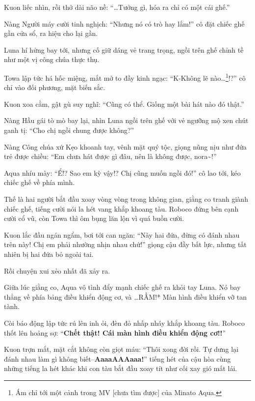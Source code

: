 \documentclass[../main.tex]{subfiles}
\begin{document}

Kuon liếc nhìn, rồi thở dài não nề: ``\dots Tưởng gì, hóa ra chỉ có một cái ghế.''

Nàng Người máy cười tinh nghịch: ``Nhưng nó có trò hay lắm!'' cô đặt chiếc ghế gần cửa sổ, ra hiệu cho lại gần.

Luna hí hửng bay tới, nhưng cố giữ dáng vẻ trang trọng, ngồi trên ghế chỉnh tề như một vị công chúa thực thụ.

Towa lập tức há hốc miệng, mắt mở to đầy kinh ngạc: ``K-Không lẽ nào\dots\footnote{Ám chỉ tới một cảnh trong MV [chưa tìm được] của Minato Aqua.}!?'' cô chỉ vào đối phương, mặt biến sắc.

Kuon xoa cằm, gật gù suy nghĩ: ``Cũng có thể. Giống một bài hát nào đó thật.''

Nàng Hầu gái tò mò bay lại, nhìn Luna ngồi trên ghế với vẻ ngưỡng mộ xen chút ganh tị: ``Cho chị ngồi chung được không?''

Nàng Công chúa xứ Kẹo khoanh tay, vênh mặt quý tộc, giọng nũng nịu như đứa trẻ được chiều: ``Em chưa hát được gì đâu, nên là không được, nora\~{}!''

Aqua nhíu mày: ``Ể!? Sao em kỳ vậy!? Chị cũng muốn ngồi đó!'' cô lao tới, kéo chiếc ghế về phía mình.

Thế là hai người bắt đầu xoay vòng vòng trong không gian, giằng co tranh giành chiếc ghế, tiếng cười nói la hét vang khắp khoang tàu. Roboco đứng bên cạnh cười cổ vũ, còn Towa thì ôm bụng lăn lộn vì quá buồn cười.


Kuon lắc đầu ngán ngẩm, bơi tới can ngăn: ``Này hai đứa, đừng có đánh nhau trên này! Chị em phải nhường nhịn nhau chứ!'' giọng cậu đầy bất lực, nhưng tất nhiên bị hai đứa bỏ ngoài tai.

Rồi chuyện xui xẻo nhất đã xảy ra.

Giữa lúc giằng co, Aqua vô tình đẩy mạnh chiếc ghế ra khỏi tay Luna. Nó bay thẳng về phía bảng điều khiển động cơ, và \dots *RẦM!* Màn hình điều khiển vỡ tan tành.

Còi báo động lập tức rú lên inh ỏi, đèn đỏ nhấp nháy khắp khoang tàu. Roboco thốt lên hoảng sợ: ``\textbf{Chết thật! Cái màn hình điều khiển động cơ!!}''

Kuon trợn mắt, mặt cắt không còn giọt máu: ``Thôi xong đời rồi. Tự dưng lại đánh nhau làm gì không biết--\textbf{AaaaAAAaaa!}'' tiếng hét của cậu hòa cùng những tiếng la hét khác khi con tàu bắt đầu xoay tít như cối xay gió mất lái.
\end{document}

